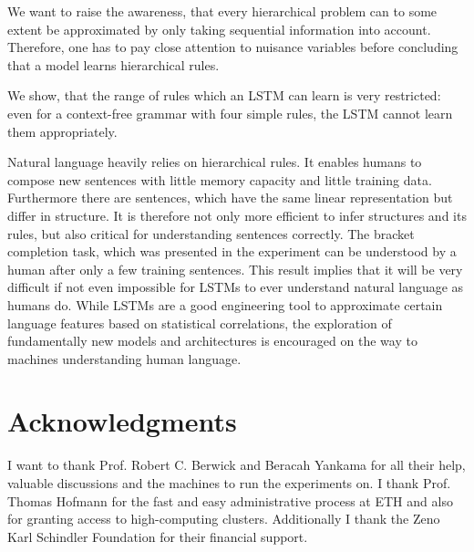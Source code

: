 \documentclass[11pt,a4paper]{article}
\begin{document}
We want to raise the awareness, that every hierarchical problem can to some extent be approximated by only taking sequential information into account. Therefore, one has to pay close attention to nuisance variables before concluding that a model learns hierarchical rules.

We show, that the range of rules which an LSTM can learn is very restricted: even for a context-free grammar with four simple rules, the LSTM cannot learn them appropriately. 

Natural language heavily relies on hierarchical rules. It enables humans to compose new sentences with little memory capacity and little training data. Furthermore there are sentences, which have the same linear representation but differ in structure. It is therefore not only more efficient to infer structures and its rules, but also critical for understanding sentences correctly. The bracket completion task, which was presented in the experiment can be understood by a human after only a few training sentences. This result implies that it will be very difficult if not even impossible for LSTMs to ever understand natural language as humans do. While LSTMs are a good engineering tool to approximate certain language features based on statistical correlations, the exploration of fundamentally new models and architectures is encouraged on the way to machines understanding human language.

\section*{Acknowledgments}
I want to thank Prof. Robert C. Berwick and Beracah Yankama for all their help, valuable discussions and the machines to run the experiments on. I thank Prof. Thomas Hofmann for the fast and easy administrative process at ETH and also for granting access to high-computing clusters. Additionally I thank the Zeno Karl Schindler Foundation for their financial support.



\end{document}
